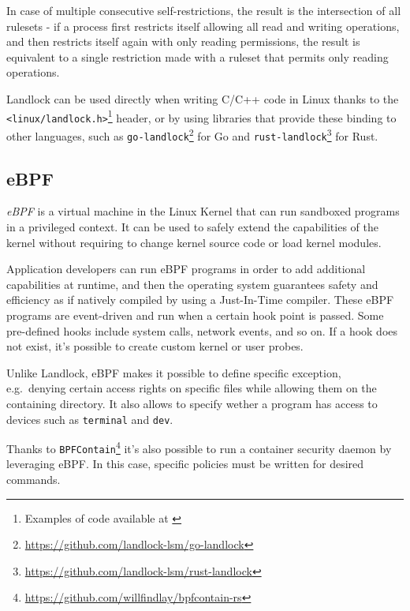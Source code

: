 In case of multiple consecutive self-restrictions, the result is the intersection
of all rulesets - if a process first restricts itself allowing all read and writing operations,
and then restricts itself again with only reading permissions, the result is equivalent
to a single restriction made with a ruleset that permits only reading operations.

Landlock can be used directly when writing C/C++ code in Linux thanks to the
\texttt{<linux/landlock.h>}\footnote{Examples of code available at \cite{landlock-user-space}}
header, or by using libraries that provide these binding to other languages,
such as \texttt{go-landlock}\footnote{\url{https://github.com/landlock-lsm/go-landlock}}
for Go and \texttt{rust-landlock}\footnote{\url{https://github.com/landlock-lsm/rust-landlock}} for Rust.

\subsection{eBPF}
\textit{eBPF} \cite{ebpf} is a virtual machine in the Linux Kernel that can run sandboxed programs
in a privileged context. It can be used to safely extend the capabilities of the kernel
without requiring to change kernel source code or load kernel modules.

Application developers can run eBPF programs in order to add additional capabilities at runtime,
and then the operating system guarantees safety and efficiency as if natively compiled
by using a Just-In-Time compiler.
These eBPF programs are event-driven and run when a certain hook point is passed. Some
pre-defined hooks include system calls, network events, and so on. If a hook does not exist,
it's possible to create custom kernel or user probes.

Unlike Landlock, eBPF makes it possible to define specific exception, e.g.\ denying
certain access rights on specific files while allowing them on the containing directory.
It also allows to specify wether a program has access to devices such as \texttt{terminal}
and \texttt{dev}.

Thanks to \texttt{BPFContain}\footnote{\url{https://github.com/willfindlay/bpfcontain-rs}}
it's also possible to run a container security daemon by leveraging eBPF.  In this case,
specific policies must be written for desired commands.